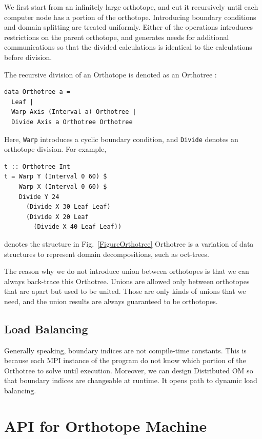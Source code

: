 \documentclass[twocolumn]{article}
\begin{document}
We first start from an infinitely large orthotope, and cut it recursively
until each computer node has a portion of the orthotope. Introducing boundary
conditions and domain splitting are treated uniformly. Either of the
operations introduces restrictions on the parent orthotope, and generates
needs for additional communications so that the divided calculations is
identical to the calculations before division.

The recursive division of an Orthotope is denoted as an Orthotree :
\begin{verbatim}
data Orthotree a = 
  Leaf |
  Warp Axis (Interval a) Orthotree |
  Divide Axis a Orthotree Orthotree
\end{verbatim}

Here, {\tt Warp} introduces a cyclic boundary condition, and {\tt Divide}
denotes an orthotope division. For example,

\begin{verbatim}
t :: Orthotree Int
t = Warp Y (Interval 0 60) $
    Warp X (Interval 0 60) $
    Divide Y 24 
      (Divide X 30 Leaf Leaf)
      (Divide X 20 Leaf
        (Divide X 40 Leaf Leaf))
\end{verbatim}

denotes the structure in Fig.~\ref{FigureOrthotree} Orthotree is a variation
of data structures to represent domain decompositions, such as oct-trees.

The reason why we do not introduce union between orthotopes is that we can
always back-trace this Orthotree. Unions are allowed only between orthotopes
that are apart but used to be united. Those are only kinds of unions that we
need, and the union results are always guaranteed to be orthotopes.

\subsection{Load Balancing}

Generally speaking, boundary indices are not compile-time constants. This is
because each MPI instance of the program do not know which portion of the
Orthotree to solve until execution. Moreover, we can design Distributed OM so
that boundary indices are changeable at runtime. It opens path to dynamic load
balancing.


\section{API for Orthotope Machine}
\end{document}
